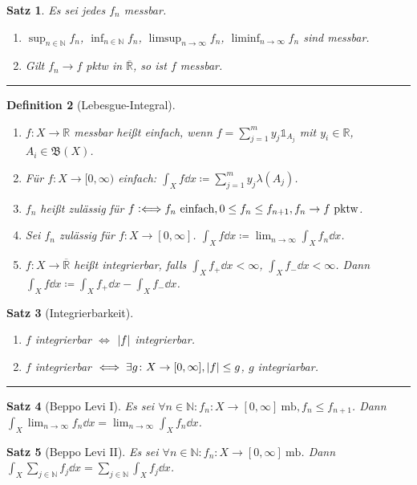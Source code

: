 \documentclass[a4paper]{article}
\newcounter{Sec}
\theoremstyle{marginbreak}
\newtheorem{definition}{Definition}[Sec]
\newtheorem{satz}[definition]{Satz}
\newcommand{\sep}{%
	\rule{\textwidth}{0.3pt}%
	\stepcounter{Sec}%
	}
\newcommand{\defiff}{\mathrel{\vcentcolon\Longleftrightarrow}}
\newcommand{\R}{\mathbb{R}}
\newcommand{\B}{\mathfrak{B}}
\begin{document}
	\begin{satz}
		Es sei jedes $f_n$ messbar.
		\begin{enumerate}[label=(\alph*)]
			\item $\sup_{n\in\mathbb{N}} f_n$, $\inf_{n\in\mathbb{N}} f_n$, $\limsup_{n\to\infty} f_n$, $\liminf_{n\to\infty} f_n$ sind messbar.
			\item Gilt $f_n\to f$ pktw in $\overline{\R}$, so ist $f$ messbar.
		\end{enumerate}
	\end{satz}
	\sep
	\begin{definition}[Lebesgue-Integral]
		\begin{enumerate}[label=(\alph*)]
			\item $f\colon X\to\R$ messbar heißt einfach, wenn $f=\sum_{j=1}^my_j\mathds{1}_{A_j}$ mit $y_i\in\R$, $A_i\in\B(X)$.
			\item Für $f\colon X\to[0,\infty)$ einfach: $\int_Xf\dd{x}\coloneqq\sum_{j=1}^my_j\lambda(A_j)$.
			\item $f_n$ heißt zulässig für $f\defiff f_n~\text{einfach}, 0\leq f_n\leq f_{n+1}, f_n\to f~\text{pktw}$.
			\item Sei $f_n$ zulässig für $f\colon X\to [0,\infty]$. $\int_X f\dd{x}\coloneqq \lim_{n\to\infty}\int_Xf_n\dd{x}$.
			\item $f\colon X\to\overline{\R}$ heißt integrierbar, falls $\int_X f_+\dd{x}<\infty$, $\int_X f_-\dd{x}<\infty$.
				Dann $\int_X f\dd{x}\coloneqq \int_X f_+\dd{x} - \int_X f_-\dd{x}$.
		\end{enumerate}
	\end{definition}
	\begin{satz}[Integrierbarkeit]
		\begin{enumerate}[label=(\alph*)]
			\item $f$ integrierbar $\iff$ $\abs{f}$ integrierbar.
			\item $f$ integrierbar $\iff\exists g\colon X\to[0,\infty], \abs{f}\leq g$, $g$ integriarbar.
		\end{enumerate}
	\end{satz}
	\sep
	\begin{satz}[Beppo Levi I]
		Es sei $\forall n\in\mathbb{N}: f_n\colon X\to[0,\infty]~\text{mb}, f_n\leq f_{n+1}$.
		Dann $\int_X\lim_{n\to\infty}f_n\dd{x} = \lim_{n\to\infty}\int_Xf_n\dd{x}$.
	\end{satz}
	\begin{satz}[Beppo Levi II]
		Es sei $\forall n\in\mathbb{N}: f_n\colon X\to[0,\infty]~\text{mb}$.
		Dann $\int_X\sum_{j\in\mathbb{N}}f_j\dd{x} = \sum_{j\in\mathbb{N}}\int_Xf_j\dd{x}$.
	\end{satz}
\end{document}

